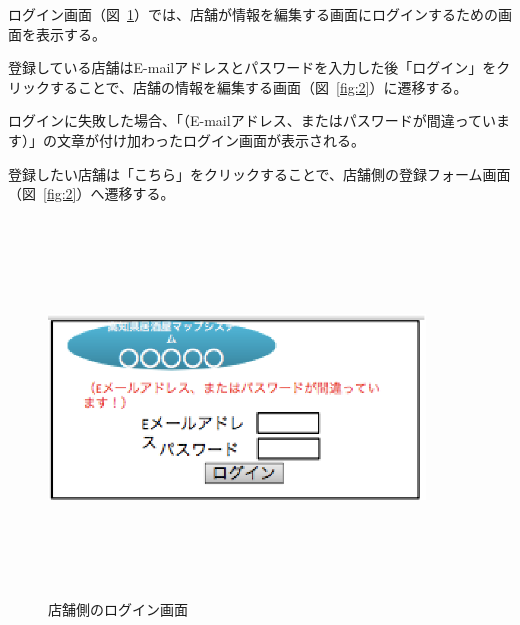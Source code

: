 \clearpage
ログイン画面（図~\ref{fig:27}）では、店舗が情報を編集する画面にログインするための画面を表示する。



登録している店舗はE-mailアドレスとパスワードを入力した後「ログイン」をクリックすることで、店舗の情報を編集する画面（図~\ref{fig:2}）に遷移する。



ログインに失敗した場合、「（E-mailアドレス、またはパスワードが間違っています）」の文章が付け加わったログイン画面が表示される。



登録したい店舗は「こちら」をクリックすることで、店舗側の登録フォーム画面（図~\ref{fig:2}）へ遷移する。



\begin {figure}[!htbp]
    \begin{center}
    \includegraphics [height=10cm, width=10cm]{27.eps}
    \caption {店舗側のログイン画面}
    \label {fig:27}
    \end{center}
\end {figure}



